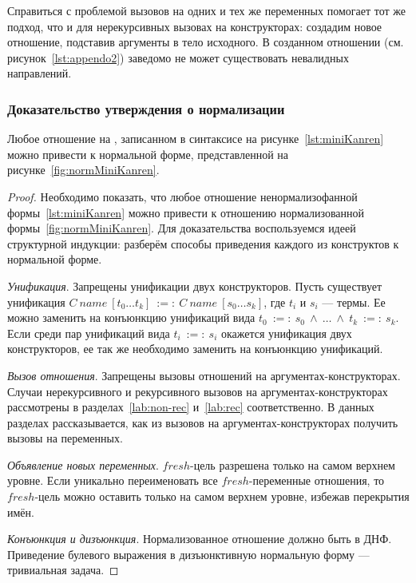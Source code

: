 Справиться с проблемой вызовов на одних и тех же переменных помогает тот же подход, что и для нерекурсивных вызовах на конструкторах: создадим новое отношение, подставив аргументы в тело исходного.
В созданном отношении (см. рисунок~\ref{lst:appendo2}) заведомо не может существовать невалидных направлений.


\subsubsection{Доказательство утверждения о нормализации}
\label{lab:normProof}

\begin{theorem}
    Любое отношение на \miniKanren{}, записанном в синтаксисе на рисунке~\ref{lst:miniKanren} можно привести к нормальной форме, представленной на рисунке~\ref{fig:normMiniKanren}.
\end{theorem}

\begin{proof}
    Необходимо показать, что любое отношение ненормализофанной формы~\ref{lst:miniKanren} можно привести к отношению нормализованной формы~\ref{fig:normMiniKanren}.
    Для доказательства воспользуемся идеей структурной индукции: разберём способы приведения каждого из конструктов к нормальной форме.

    \textit{Унификация}.
    Запрещены унификации двух конструкторов.
    Пусть существует унификация $C~name~[t_0 \dots t_k]~:=:~C~name~[s_0 \dots s_k]$, где $t_i$ и $s_i$ --- термы.
    Ее можно заменить на конъюнкцию унификаций вида $t_0~:=:~s_0~\wedge~\dots~\wedge~t_k~:=:~s_k$.
    Если среди пар унификаций вида $t_i~:=:~s_i$ окажется унификация двух конструкторов, ее так же необходимо заменить на конъюнкцию унификаций.

    \textit{Вызов отношения}.
    Запрещены вызовы отношений на аргументах-конструкторах.
    Случаи нерекурсивного и рекурсивного вызовов на аргументах-конструкторах рассмотрены в разделах~\ref{lab:non-rec} и~\ref{lab:rec} соответственно.
    В данных разделах рассказывается, как из вызовов на аргументах-конструкторах получить вызовы на переменных.

    \textit{Объявление новых переменных}.
    $fresh$-цель разрешена только на самом верхнем уровне.
    Если уникально переименовать все $fresh$-переменные отношения, то $fresh$-цель можно оставить только на самом верхнем уровне, избежав перекрытия имён.

    \textit{Конъюнкция и дизъюнкция}.
    Нормализованное отношение должно быть в ДНФ.
    Приведение булевого выражения в дизъюнктивную нормальную форму --- тривиальная задача.
\end{proof}
